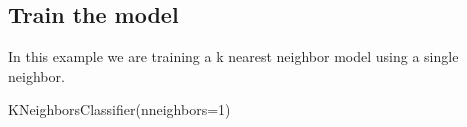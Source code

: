 \documentclass[letterpaper,10pt,english]{sphinxmanual}
\begin{document}
\subsection{Train the model}
\label{\detokenize{ML4NeutronImageSegmentation:train-the-model}}
In this example we are training a k nearest neighbor model using a single neighbor.

\begin{sphinxVerbatim}[commandchars=\\\{\}]
  
\PYG{p}{[}\PYG{p}{[} \PYG{p}{]}\PYG{p}{]} \PYG{p}{[}\PYG{p}{]} 
\end{sphinxVerbatim}

\begin{sphinxVerbatim}[commandchars=\\\{\}]
KNeighborsClassifier(n\PYGZus{}neighbors=1)
\end{sphinxVerbatim}

\end{document}
